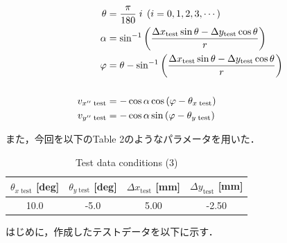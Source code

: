 \documentclass[twocolumn,a4j]{jsarticle}
\begin{document}
\begin{align*}
    \theta                  & = \frac{\pi}{180} \; i \;\left(i = 0, 1, 2, 3, \cdots\right)                                                       \\
    \alpha                  & = \sin^{-1} \left( \frac{\Delta x_\mathrm{test} \sin \theta - \Delta y_\mathrm{test} \cos \theta}{r} \right)       \\
    \varphi                 & = \theta - \sin^{-1}\left(\frac{\Delta x_\mathrm{test} \sin \theta - \Delta y_\mathrm{test} \cos \theta}{r}\right) \\
    \notag                                                                                                                                       \\
    v_{x'' \;\mathrm{test}} & = - \cos \alpha \cos \left(\varphi - \theta_{x\; \mathrm{test}} \right)                                            \\
    v_{y'' \;\mathrm{test}} & = - \cos \alpha \sin \left(\varphi - \theta_{y\; \mathrm{test}}\right)
\end{align*}

また，今回を以下のTable 2のようなパラメータを用いた．

\begin{table}[htbp]
    \begin{center}
        \caption{Test data conditions (3)}
        \begin{tabular}{|p{20mm}|p{20mm}|p{20mm}|p{20mm}|}
            \hline
            \multicolumn{1}{|c|}{$\theta_{x\;\mathrm{test}}$ [deg]} & \multicolumn{1}{|c|}{$\theta_{y\;\mathrm{test}}$ [deg]} & \multicolumn{1}{|c|}{$\Delta x_\mathrm{test}$ [mm]} & \multicolumn{1}{|c|}{$\Delta y_\mathrm{test}$ [mm]} \\ \hline
            \multicolumn{1}{|c|}{10.0}                              & \multicolumn{1}{|c|}{-5.0}                              & \multicolumn{1}{|c|}{5.00}                          & \multicolumn{1}{|c|}{-2.50}                         \\ \hline
        \end{tabular}
    \end{center}
\end{table}

はじめに，作成したテストデータを以下に示す．
\end{document}
